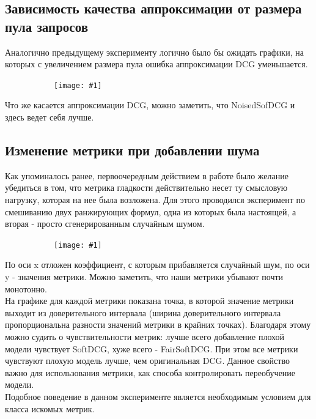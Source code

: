 \documentclass[14pt,a4paper]{amsart}
\theoremstyle{definition}
\theoremstyle{definition}
\newcommand{\incpic}[1]{
\begin{figure}[!h]
    \centering
    \begin{subfigure}{\textwidth}
    \centering
        \texttt{[image: \#1]}
    \end{subfigure}
\end{figure}
}
\begin{document}

\subsection{Зависимость качества аппроксимации от размера пула запросов}

Аналогично предыдущему эксперименту логично было бы ожидать графики, на которых с увеличением размера пула ошибка аппроксимации DCG уменьшается. \\

\incpic{dcg_approximation}

Что же касается аппроксимации DCG, можно заметить, что NoisedSofDCG и здесь ведет себя лучше. 


\subsection{Изменение метрики при добавлении шума}

Как упоминалось ранее, первоочередным действием в работе было желание убедиться в том, что метрика гладкости действительно несет ту смысловую нагрузку, которая на нее была возложена. Для этого проводился эксперимент по смешиванию двух ранжирующих формул, одна из которых была настоящей, а вторая - просто сгенерированным случайным шумом.

\incpic{noised_metrics}

По оси x отложен коэффициент, с которым прибавляется случайный шум, по оси y - значения метрики. Можно заметить, что наши метрики убывают почти монотонно. \\

На графике для каждой метрики показана точка, в которой значение метрики выходит из доверительного интервала (ширина доверительного интервала пропорциональна разности значений метрики в крайних точках). Благодаря этому можно судить о чувствительности метрик: лучше всего добавление плохой модели чувствует SoftDCG, хуже всего - FairSoftDCG. При этом все метрики чувствуют плохую модель лучше, чем оригинальная DCG. Данное свойство важно для использования метрики, как способа контролировать переобучение модели. \\

Подобное поведение в данном эксперименте является необходимым условием для класса искомых метрик.
\end{document}
